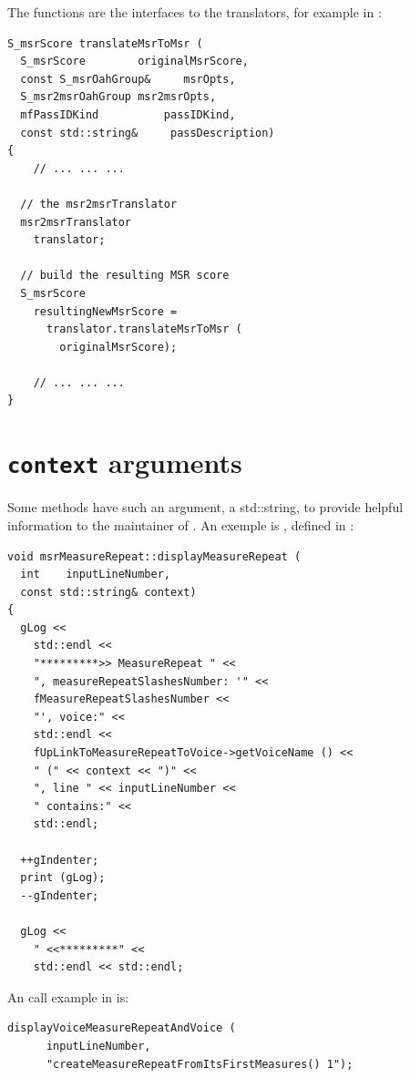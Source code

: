 The  functions are the interfaces to the translators, for example in :
\begin{lstlisting}[language=CPlusPlus]
S_msrScore translateMsrToMsr (
  S_msrScore        originalMsrScore,
  const S_msrOahGroup&     msrOpts,
  S_msr2msrOahGroup msr2msrOpts,
  mfPassIDKind          passIDKind,
  const std::string&     passDescription)
{
	// ... ... ...

  // the msr2msrTranslator
  msr2msrTranslator
    translator;

  // build the resulting MSR score
  S_msrScore
    resultingNewMsrScore =
      translator.translateMsrToMsr (
        originalMsrScore);

	// ... ... ...
}
\end{lstlisting}


\section{{\tt context} arguments}

Some methods have such an argument, a std::string, to provide helpful information to the maintainer of \mf. An exemple is , defined in :
\begin{lstlisting}[language=CPlusPlus]
void msrMeasureRepeat::displayMeasureRepeat (
  int    inputLineNumber,
  const std::string& context)
{
  gLog <<
    std::endl <<
    "*********>> MeasureRepeat " <<
    ", measureRepeatSlashesNumber: '" <<
    fMeasureRepeatSlashesNumber <<
    "', voice:" <<
    std::endl <<
    fUpLinkToMeasureRepeatToVoice->getVoiceName () <<
    " (" << context << ")" <<
    ", line " << inputLineNumber <<
    " contains:" <<
    std::endl;

  ++gIndenter;
  print (gLog);
  --gIndenter;

  gLog <<
    " <<*********" <<
    std::endl << std::endl;
\end{lstlisting}

An call example in  is:
\begin{lstlisting}[language=CPlusPlus]
    displayVoiceMeasureRepeatAndVoice (
      inputLineNumber,
      "createMeasureRepeatFromItsFirstMeasures() 1");
\end{lstlisting}


